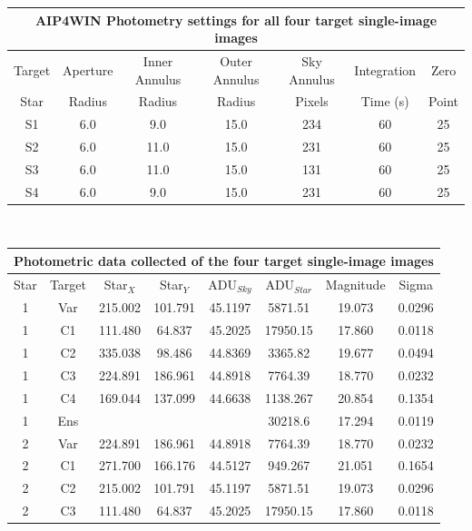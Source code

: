 \documentclass[12pt]{article}
\begin{document}
\begin{table}[H]
\begin{center}
 \footnotesize
 \begin{tabular}{|c||c|c|c||c||c|c|}
 \hline
 \multicolumn{7}{|c|}{AIP4WIN Photometry settings for all four target single-image images} \\
 \hline \hline
 Target & Aperture & Inner Annulus & Outer Annulus & Sky Annulus & Integration & Zero  \\
 Star & Radius & Radius & Radius & Pixels & Time (s) & Point \\
 \hline \hline
 S1 & 6.0 & 9.0 & 15.0 & 234 & 60 & 25 \\
 \hline
 S2 & 6.0 & 11.0 & 15.0 & 231 & 60 & 25 \\
 \hline
 S3 & 6.0 & 11.0 & 15.0 & 131 & 60 & 25 \\
 \hline
 S4 & 6.0 & 9.0 & 15.0 & 231 & 60 & 25  \\
 \hline
 \end{tabular} \\ [0.5cm]
 \begin{tabular}{|c|c||c|c||c|c||c|c|}
 \hline
 \multicolumn{8}{|c|}{Photometric data collected of the four target single-image images} \\
 \hline \hline
 Star & Target & Star$_X$ & Star$_Y$ & ADU$_{Sky}$ & ADU$_{Star}$ & Magnitude & Sigma\\
 \hline \hline
 1&  Var & 215.002  &101.791  &         45.1197&    5871.51  & 19.073 &0.0296 \\
 1&  C1 & 111.480   &64.837     &     45.2025   &17950.15   &17.860 &0.0118\\
 1&  C2  &335.038   &98.486      &     44.8369   & 3365.82   &19.677& 0.0494\\
 1&  C3  &224.891  &186.961      &   44.8918    &7764.39  & 18.770 &0.0232\\
 1&  C4  &169.044  &137.099       &  44.6638   &1138.267  & 20.854 &0.1354\\
 1&Ens                     &  & & &                     30218.6   &17.294 &0.0119\\
 \hline \hline
 2& Var & 224.891 & 186.961  &  44.8918 &   7764.39  & 18.770 &0.0232\\
  2 & C1 & 271.700  &166.176   &      44.5127 &   949.267 &  21.051& 0.1654\\
  2& C2  &215.002  &101.791    &       45.1197  &  5871.51 &  19.073& 0.0296\\
  2& C3  &111.480   &64.837  & 45.2025  & 17950.15  & 17.860 &0.0118\\

\end{tabular}
\end{center}
\end{table}
\end{document}
